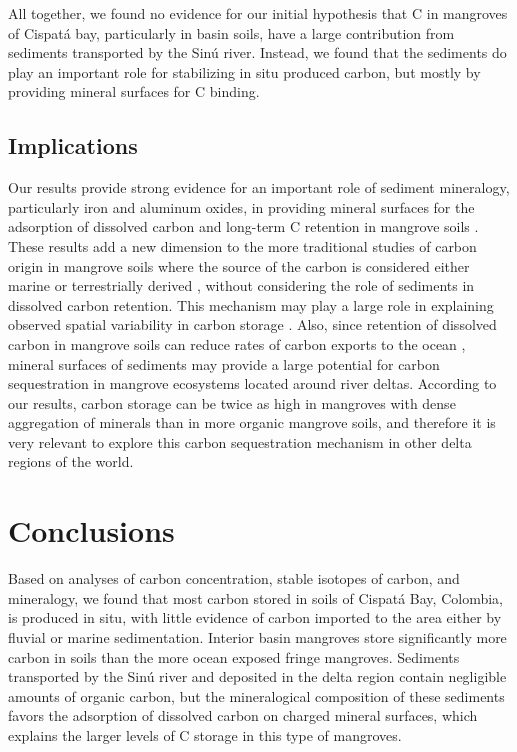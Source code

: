 All together, we found no evidence for our initial hypothesis that C in mangroves of Cispat\'a bay, particularly in basin soils, have a large contribution from sediments transported by the Sin\'u river. Instead, we found that the sediments do play an important role for stabilizing in situ produced carbon, but mostly by providing mineral surfaces for C binding. 

\subsection{Implications}
Our results provide strong evidence for an important role of sediment mineralogy, particularly iron and aluminum oxides, in providing mineral surfaces for the adsorption of dissolved carbon and long-term C retention \citep{Oades1988} in mangrove soils . These results add a new dimension to the more traditional studies of carbon origin in mangrove soils where the source of the carbon is considered either marine or terrestrially derived \citep{lacerda, Bouillion}, without considering the role of sediments in dissolved carbon retention. This mechanism may play a large role in explaining observed spatial variability in carbon storage \citep{Alongi2012, Jardine2014}. Also, since retention of dissolved carbon in mangrove soils can reduce rates of carbon exports to the ocean \citep{Adame2011}, mineral surfaces of sediments may provide a large potential for carbon sequestration in mangrove ecosystems located around river deltas. According to our results, carbon storage can be twice as high in mangroves with dense aggregation of minerals than in more organic mangrove soils, and therefore it is very relevant to explore this carbon sequestration mechanism in other delta regions of the world. 

\section{Conclusions}
Based on analyses of carbon concentration, \DIFdelbegin {}\DIFdelend stable isotopes of carbon, and mineralogy, we found that most carbon stored in soils of Cispat\'a Bay, Colombia, is produced in situ, with little evidence of carbon imported to the area either by fluvial or marine sedimentation. Interior basin mangroves store significantly more carbon in soils than the more ocean exposed fringe mangroves. Sediments transported by the Sin\'u river and deposited in the delta region contain negligible amounts of organic carbon, but the mineralogical composition of these sediments favors the adsorption of dissolved carbon on charged mineral surfaces, which explains the larger levels of C storage in this type of mangroves. 


